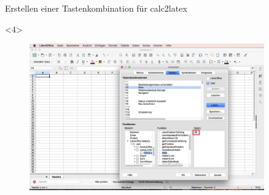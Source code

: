 \documentclass["WS\space 16-17\space -\space LaTeX-Kurs\space -\space Praesentation\space -\space 2.tex"]{subfiles}
\begin{document}
\begin{frame}[c]{Erstellen einer Tastenkombination für calc2latex}
\begin{onlyenv}
\begin{figure}[htbp]
		\end{figure}
	\end{onlyenv}
	\begin{onlyenv}
		\begin{figure}[htbp]
			\centering
			\includegraphics[width=0.9\textwidth]{img/Bildschirmfoto_mitKasten/2_Tastenkombination/4.jpg}
		\end{figure}
	\end{onlyenv}
\end{frame}
\end{document}
